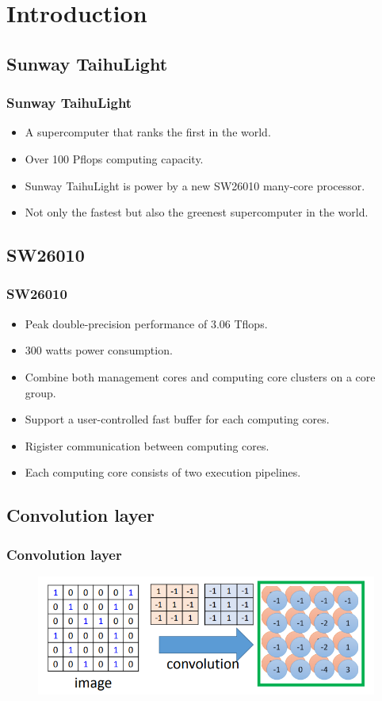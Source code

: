 \section{Introduction}

\subsection{Sunway TaihuLight}
\begin{frame}
    \frametitle{Sunway TaihuLight}
	\begin{itemize}
		\item A supercomputer that ranks the first in the world.
		\item Over 100 Pflops computing capacity. 
		\item Sunway TaihuLight is power by a new SW26010 many-core processor.  
		\item Not only the fastest but also the greenest supercomputer in the world.  
	\end{itemize} 
\end{frame}

\subsection{SW26010}
\begin{frame}
    \frametitle{SW26010}
	\begin{itemize}
		\item Peak double-precision performance of 3.06 Tflops.
		\item 300 watts power consumption.
		\item Combine both management cores and computing core clusters on a core group.  
		\item Support a user-controlled fast buffer for each computing cores. 
		\item Rigister communication between computing cores.
		\item Each computing core consists of two execution pipelines.  
	\end{itemize} 
\end{frame}

\subsection{Convolution layer}
\begin{frame}
    \frametitle{Convolution layer}
	\begin{figure}
		\includegraphics[scale=0.5]{figure/conv-1.PNG}
	\end{figure}
\end{frame}

